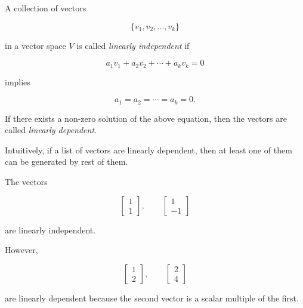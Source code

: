 \begin{definition}
	A collection of vectors

	\begin{equation}
		\{v_1,v_2,\dots,v_k\}
		\label{eq:linear-independence-1}
	\end{equation}

	in a vector space \(V\) is called \emph{linearly independent} if

	\begin{equation}
		a_1v_1+a_2v_2+\cdots+a_kv_k=0
		\label{eq:linear-independence-2}
	\end{equation}

	implies

	\begin{equation}
		a_1=a_2=\cdots=a_k=0 .
		\label{eq:linear-independence-3}
	\end{equation}

	If there exists a non-zero solution of the above equation, then the vectors are
	called \emph{linearly dependent}.

	Intuitively, if a list of vectors are linearly dependent, then at least one of them can be generated by rest of them.
\end{definition}

\begin{example}
	The vectors

	\begin{equation}
		\begin{bmatrix}
			1 \\1
		\end{bmatrix},
		\qquad
		\begin{bmatrix}
			1 \\-1
		\end{bmatrix}
		\label{eq:basis-and-dimension-of-r-6}
	\end{equation}

	are linearly independent.

	However,

	\begin{equation}
		\begin{bmatrix}
			1 \\2
		\end{bmatrix},
		\qquad
		\begin{bmatrix}
			2 \\4
		\end{bmatrix}
		\label{eq:basis-and-dimension-of-r-7}
	\end{equation}

	are linearly dependent because the second vector is a scalar multiple of the
	first.
\end{example}

